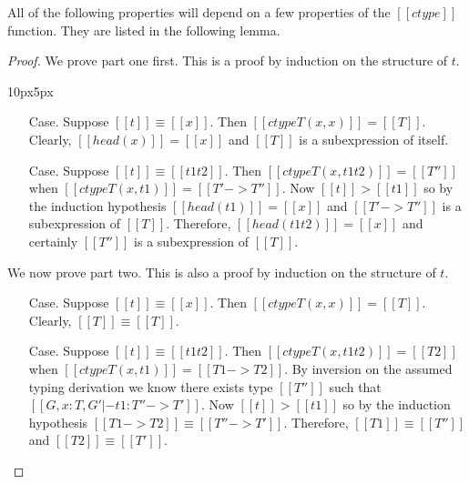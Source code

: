 All of the following properties will depend on a few 
properties of the $[[ctype]]$ function.  They are listed in 
the following lemma.
\begin{proof}
  We prove part one first. This is a proof by induction on the structure of $t$.
  \vspace{-25px}
  \begin{changemargin}{10px}{5px}\noindent
  \begin{itemize}
  \item[Case.] Suppose $[[t]] \equiv [[x]]$.  Then $[[ctype T (x,x)]] = [[T]]$.  Clearly,
    $[[head(x)]] = [[x]]$ and $[[T]]$ is a subexpression of itself.
    
  \item[Case.] Suppose $[[t]] \equiv [[t1 t2]]$.  Then $[[ctype T (x,t1 t2)]] = [[T'']]$
    when $[[ctype T (x,t1)]] = [[T' -> T'']]$.  Now $[[t]] > [[t1]]$ so by the induction
    hypothesis $[[head(t1)]] = [[x]]$ and $[[T' -> T'']]$ is a subexpression of $[[T]]$.
    Therefore, $[[head(t1 t2)]] = [[x]]$ and certainly $[[T'']]$ is a subexpression of $[[T]]$.
  \end{itemize}

  We now prove part two.  This is also a proof by induction on the structure of $t$.

  \begin{itemize}
  \item[Case.] Suppose $[[t]] \equiv [[x]]$.  Then $[[ctype T (x,x)]] = [[T]]$.  Clearly,
    $[[T]] \equiv [[T]]$.
    
  \item[Case.] Suppose $[[t]] \equiv [[t1 t2]]$.  Then $[[ctype T (x,t1 t2)]] = [[T2]]$
    when $[[ctype T (x,t1)]] = [[T1 -> T2]]$.  By inversion on the assumed typing
    derivation we know there exists type $[[T'']]$ such that $[[G,x:T,G' |- t1:T'' -> T']]$.
    Now $[[t]] > [[t1]]$ so by the induction hypothesis $[[T1 -> T2]] \equiv [[T'' -> T']]$.
    Therefore, $[[T1]] \equiv [[T'']]$ and $[[T2]] \equiv [[T']]$.
  \end{itemize}
  \end{changemargin}
\end{proof}


